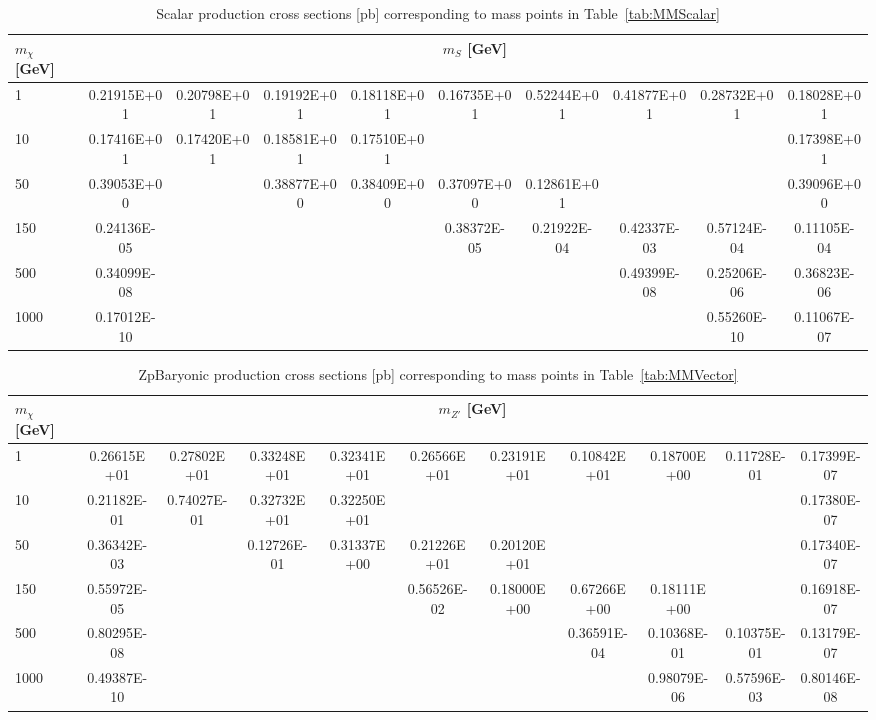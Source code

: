 \begin{sidewaystable*}[htbH]
\begin{adjustbox}{width=\textwidth,totalheight=\textheight,keepaspectratio}
\label{tab:scalarxsecs}
\begin{tabular}{l | c | c | c | c | c | c | c | c | c}
\hline 
$m_\chi$ [GeV] & \multicolumn{9}{c}{$m_{S}$ [GeV]} \\ 
\hline
1 & 0.21915E+01 & 0.20798E+01 & 0.19192E+01 & 0.18118E+01 & 0.16735E+01 & 0.52244E+01 & 0.41877E+01 & 0.28732E+01 & 0.18028E+01\\
10 & 0.17416E+01 & 0.17420E+01 & 0.18581E+01 & 0.17510E+01 & & & & & 0.17398E+01\\
50 & 0.39053E+00 & & 0.38877E+00 & 0.38409E+00 & 0.37097E+00 & 0.12861E+01 & & & 0.39096E+00\\
150 & 0.24136E-05 & & & & 0.38372E-05 & 0.21922E-04 & 0.42337E-03 & 0.57124E-04 & 0.11105E-04\\
500 & 0.34099E-08 & & & & & & 0.49399E-08 & 0.25206E-06 & 0.36823E-06\\
1000 & 0.17012E-10 & & & & & & & 0.55260E-10 & 0.11067E-07\\
\hline
\end{tabular}
\end{adjustbox}
\caption{Scalar production cross sections [pb] corresponding to mass points in Table~\ref{tab:MMScalar}}
\end{sidewaystable*}

\begin{sidewaystable*}[htbH]
\begin{adjustbox}{width=\textwidth,totalheight=\textheight,keepaspectratio}
\label{tab:zpbaryonicxsecs}
\begin{tabular}{l | c | c | c | c | c | c | c | c | c | c}
\hline 
$m_\chi$ [GeV] & \multicolumn{10}{c}{$m_{Z'}$ [GeV]} \\ 
\hline
1 & 0.26615E+01 & 0.27802E+01 & 0.33248E+01 & 0.32341E+01 & 0.26566E+01 & 0.23191E+01 & 0.10842E+01 & 0.18700E+00 & 0.11728E-01 & 0.17399E-07\\
10 & 0.21182E-01 & 0.74027E-01 & 0.32732E+01 & 0.32250E+01 & & & & & & 0.17380E-07\\
50 & 0.36342E-03 & & 0.12726E-01 & 0.31337E+00  & 0.21226E+01 & 0.20120E+01 & & & & 0.17340E-07\\
150 & 0.55972E-05 & & & & 0.56526E-02 & 0.18000E+00 & 0.67266E+00 & 0.18111E+00 & & 0.16918E-07\\
500 & 0.80295E-08 & & & & & & 0.36591E-04 & 0.10368E-01 & 0.10375E-01 & 0.13179E-07\\
1000 & 0.49387E-10 & & & & & & & 0.98079E-06 & 0.57596E-03 & 0.80146E-08\\
\hline
\end{tabular}
\end{adjustbox}
\caption{ZpBaryonic production cross sections [pb] corresponding to mass points in Table~\ref{tab:MMVector}}
\end{sidewaystable*}


